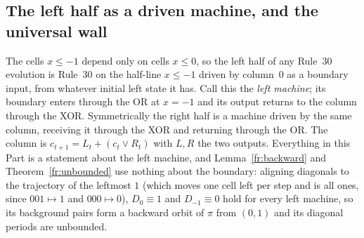 \documentclass[11pt]{article}
\theoremstyle{definition}
\theoremstyle{remark}
\begin{document}
\subsection{The left half as a driven machine, and the universal wall}\label{fr:machine}

The cells $x\le-1$ depend only on cells $x\le0$, so the left half of any Rule~30 evolution is Rule~30 on the half-line $x\le-1$ driven by column~$0$ as a boundary input, from whatever initial left state it has. Call this the \emph{left machine}; its boundary enters through the OR at $x=-1$ and its output returns to the column through the XOR. Symmetrically the right half is a machine driven by the same column, receiving it through the XOR and returning through the OR. The column is $c_{t+1}=L_t+(c_t\vee R_t)$ with $L,R$ the two outputs. Everything in this Part is a statement about the left machine, and Lemma~\ref{fr:backward} and Theorem~\ref{fr:unbounded} use nothing about the boundary: aligning diagonals to the trajectory of the leftmost $1$ (which moves one cell left per step and is all ones, since $001\mapsto1$ and $000\mapsto0$), $D_0\equiv1$ and $D_{-1}\equiv0$ hold for every left machine, so its background pairs form a backward orbit of $\pi$ from $(0,1)$ and its diagonal periods are unbounded.
\end{document}
